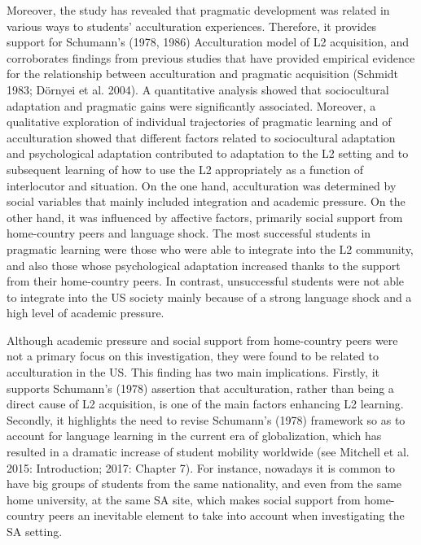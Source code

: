 \documentclass[12pt]{article}
\newenvironment{styleStandard}{\setlength\leftskip{0cm}\setlength\rightskip{0cm plus 1fil}\setlength\parindent{0cm}\setlength\parfillskip{0pt plus 1fil}\setlength\parskip{0in plus 1pt}\writerlistparindent\writerlistleftskip\leavevmode\normalfont\normalsize\writerlistlabel\ignorespaces}{\unskip\vspace{0.111in plus 0.0111in}\par}
\newcommand\writerlistleftskip{}
\newcommand\writerlistparindent{}
\newcommand\writerlistlabel{}
\begin{document}
\begin{styleStandard}
Moreover, the study has revealed that pragmatic development was related in various ways to students’ acculturation experiences. Therefore, it provides support for Schumann’s (1978, 1986) Acculturation model of L2 acquisition, and corroborates findings from previous studies that have provided empirical evidence for the relationship between acculturation and pragmatic acquisition (Schmidt 1983; Dörnyei et al. 2004). A quantitative analysis showed that sociocultural adaptation and pragmatic gains were significantly associated. Moreover, a qualitative exploration of individual trajectories of pragmatic learning and of acculturation showed that different factors related to sociocultural adaptation and psychological adaptation contributed to adaptation to the L2 setting and to subsequent learning of how to use the L2 appropriately as a function of interlocutor and situation. On the one hand, acculturation was determined by social variables that mainly included integration and academic pressure. On the other hand, it was influenced by affective factors, primarily social support from home-country peers and language shock. The most successful students in pragmatic learning were those who were able to integrate into the L2 community, and also those whose psychological adaptation increased thanks to the support from their home-country peers. In contrast, unsuccessful students were not able to integrate into the US society mainly because of a strong language shock and a high level of academic pressure. 
\end{styleStandard}

\begin{styleStandard}
Although academic pressure and social support from home-country peers were not a primary focus on this investigation, they were found to be related to acculturation in the US. This finding has two main implications. Firstly, it supports Schumann’s (1978) assertion that acculturation, rather than being a direct cause of L2 acquisition, is one of the main factors enhancing L2 learning. Secondly, it highlights the need to revise Schumann’s (1978) framework so as to account for language learning in the current era of globalization, which has resulted in a dramatic increase of student mobility worldwide (see Mitchell et al. 2015: Introduction; 2017: Chapter 7). For instance, nowadays it is common to have big groups of students from the same nationality, and even from the same home university, at the same SA site, which makes social support from home-country peers an inevitable element to take into account when investigating the SA setting. 
\end{styleStandard}
\end{document}
